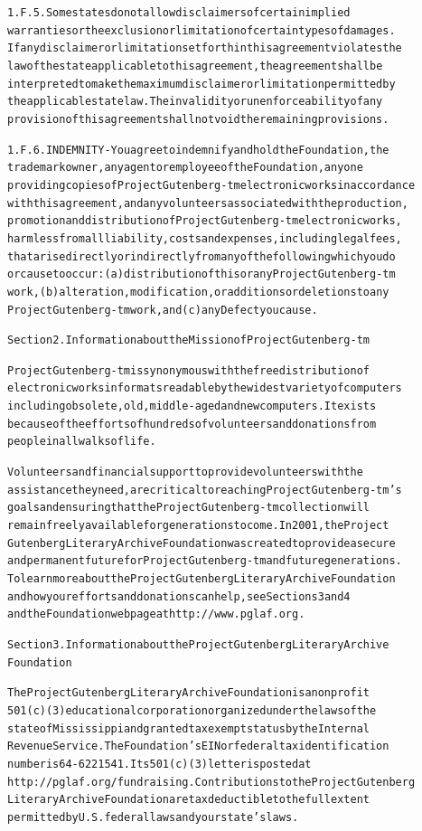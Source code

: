 \documentclass[12pt]{book}[2005/09/16]
\newenvironment{PGtext}{%
\begin{alltt}
\fontsize{8.1}{9}\ttfamily\selectfont}%
{\end{alltt}}
\begin{document}
\begin{PGtext}
1.F.5.  Some states do not allow disclaimers of certain implied
warranties or the exclusion or limitation of certain types of damages.
If any disclaimer or limitation set forth in this agreement violates the
law of the state applicable to this agreement, the agreement shall be
interpreted to make the maximum disclaimer or limitation permitted by
the applicable state law.  The invalidity or unenforceability of any
provision of this agreement shall not void the remaining provisions.

1.F.6.  INDEMNITY - You agree to indemnify and hold the Foundation, the
trademark owner, any agent or employee of the Foundation, anyone
providing copies of Project Gutenberg-tm electronic works in accordance
with this agreement, and any volunteers associated with the production,
promotion and distribution of Project Gutenberg-tm electronic works,
harmless from all liability, costs and expenses, including legal fees,
that arise directly or indirectly from any of the following which you do
or cause to occur: (a) distribution of this or any Project Gutenberg-tm
work, (b) alteration, modification, or additions or deletions to any
Project Gutenberg-tm work, and (c) any Defect you cause.


Section  2.  Information about the Mission of Project Gutenberg-tm

Project Gutenberg-tm is synonymous with the free distribution of
electronic works in formats readable by the widest variety of computers
including obsolete, old, middle-aged and new computers.  It exists
because of the efforts of hundreds of volunteers and donations from
people in all walks of life.

Volunteers and financial support to provide volunteers with the
assistance they need, are critical to reaching Project Gutenberg-tm's
goals and ensuring that the Project Gutenberg-tm collection will
remain freely available for generations to come.  In 2001, the Project
Gutenberg Literary Archive Foundation was created to provide a secure
and permanent future for Project Gutenberg-tm and future generations.
To learn more about the Project Gutenberg Literary Archive Foundation
and how your efforts and donations can help, see Sections 3 and 4
and the Foundation web page at http://www.pglaf.org.


Section 3.  Information about the Project Gutenberg Literary Archive
Foundation

The Project Gutenberg Literary Archive Foundation is a non profit
501(c)(3) educational corporation organized under the laws of the
state of Mississippi and granted tax exempt status by the Internal
Revenue Service.  The Foundation's EIN or federal tax identification
number is 64-6221541.  Its 501(c)(3) letter is posted at
http://pglaf.org/fundraising.  Contributions to the Project Gutenberg
Literary Archive Foundation are tax deductible to the full extent
permitted by U.S. federal laws and your state's laws.


\end{PGtext}
\end{document}
